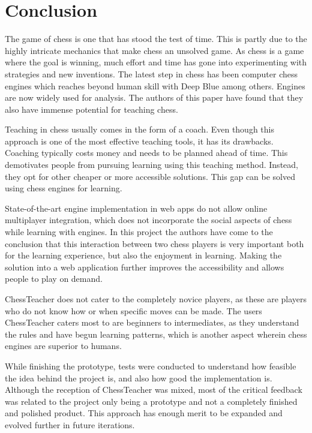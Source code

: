 \chapter{Conclusion}\label{ch:conclusion}

The game of chess is one that has stood the test of time.
This is partly due to the highly intricate mechanics that make chess an unsolved game.
As chess is a game where the goal is winning, much effort and time has gone into experimenting with
strategies and new inventions.
The latest step in chess has been computer chess engines which reaches beyond human skill with Deep Blue among others.
Engines are now widely used for analysis.
The authors of this paper have found that they also have immense potential for teaching chess.

Teaching in chess usually comes in the form of a coach.
Even though this approach is one of the most effective teaching tools, it has its drawbacks.
Coaching typically costs money and needs to be planned ahead of time.
This demotivates people from pursuing learning using this teaching method.
Instead, they opt for other cheaper or more accessible solutions.
This gap can be solved using chess engines for learning.

State-of-the-art engine implementation in web apps do not allow online multiplayer integration, which does not
incorporate the social aspects of chess while learning with engines.
In this project the authors have come to the conclusion that this interaction between two chess players is very
important both for the learning experience, but also the enjoyment in learning.
Making the solution into a web application further improves the accessibility and allows people to play on demand.

ChessTeacher does not cater to the completely novice players, as these are players who do not know how or when specific
moves can be made.
The users ChessTeacher caters most to are beginners to intermediates, as they understand the rules and have begun
learning patterns, which is another aspect wherein chess engines are superior to humans.

While finishing the prototype, tests were conducted to understand how feasible the idea behind the project is, and also
how good the implementation is.
Although the reception of ChessTeacher was mixed, most of the critical feedback was related to the project only being
a prototype and not a completely finished and polished product.
This approach has enough merit to be expanded and evolved further in future iterations.

